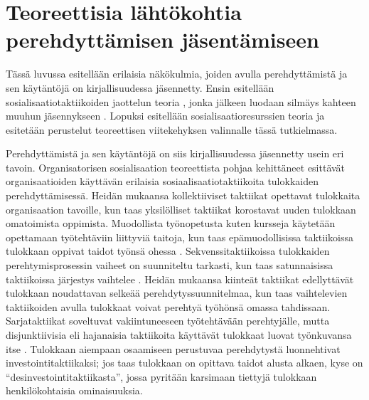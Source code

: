 \documentclass[utf8]{gradu3}
\begin{document}
\section{Teoreettisia lähtökohtia perehdyttämisen jäsentämiseen}
\label{luku-teoreettisia-lähestymistapoja-perehdyttämiseen}

Tässä luvussa esitellään erilaisia näkökulmia, joiden avulla perehdyttämistä ja sen käytäntöjä on kirjallisuudessa jäsennetty. Ensin esitellään sosialisaatiotaktiikoiden jaottelun teoria \parencite{van-maanen-schein-1979}, jonka jälkeen luodaan silmäys kahteen muuhun jäsennykseen \parencite{bauer-2010}. Lopuksi esitellään sosialisaatioresurssien teoria \parencite{saks-gruman-2012} ja esitetään perustelut teoreettisen viitekehyksen valinnalle tässä tutkielmassa.

Perehdyttämistä ja sen käytäntöjä on siis kirjallisuudessa jäsennetty usein eri tavoin. Organisatorisen sosialisaation teoreettista pohjaa kehittäneet \textcite{van-maanen-schein-1979} esittävät organisaatioiden käyttävän erilaisia sosiaalisaatiotaktiikoita tulokkaiden perehdyttämisessä. Heidän mukaansa kollektiiviset taktiikat opettavat tulokkaita organisaation tavoille, kun taas yksilölliset taktiikat korostavat uuden tulokkaan omatoimista oppimista. Muodollista työnopetusta kuten kursseja käytetään opettamaan työtehtäviin liittyviä taitoja, kun taas epämuodollisissa taktiikoissa tulokkaan oppivat taidot työnsä ohessa \parencite{van-maanen-schein-1979}. Sekvenssitaktiikoissa tulokkaiden perehtymisprosessin vaiheet on suunniteltu tarkasti, kun taas satunnaisissa taktiikoissa järjestys vaihtelee \parencite{van-maanen-schein-1979}. Heidän mukaansa kiinteät taktiikat edellyttävät tulokkaan noudattavan selkeää perehdytyssuunnitelmaa, kun taas vaihtelevien taktiikoiden avulla tulokkaat voivat perehtyä työhönsä omassa tahdissaan. Sarjataktiikat soveltuvat vakiintuneeseen työtehtävään perehtyjälle, mutta disjunktiivisia eli hajanaisia taktiikoita käyttävät tulokkaat luovat työnkuvansa itse \parencite{van-maanen-schein-1979}. Tulokkaan aiempaan osaamiseen perustuvaa perehdytystä \textcite{van-maanen-schein-1979} luonnehtivat investointitaktiikaksi; jos taas tulokkaan on opittava taidot alusta alkaen, kyse on ``desinvestointitaktiikasta'', jossa pyritään karsimaan tiettyjä tulokkaan henkilökohtaisia ominaisuuksia.
\end{document}
